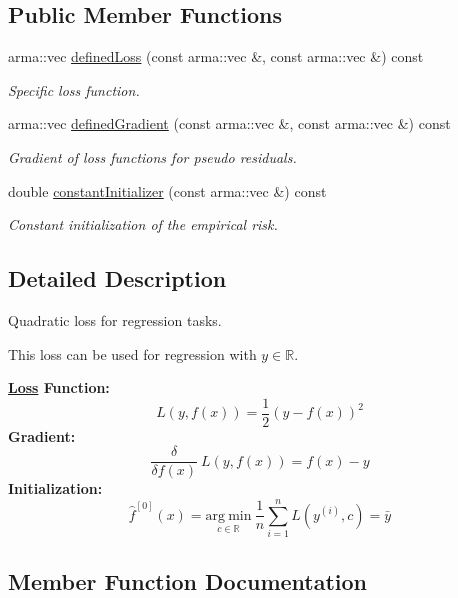 \subsection*{Public Member Functions}
\begin{DoxyCompactItemize}
\item 
arma\+::vec \mbox{\hyperlink{classloss_1_1_quadratic_loss_ae34f68243ffe021e309ed73a68796e1e}{defined\+Loss}} (const arma\+::vec \&, const arma\+::vec \&) const
\begin{DoxyCompactList}\small\item\em Specific loss function. \end{DoxyCompactList}\item 
arma\+::vec \mbox{\hyperlink{classloss_1_1_quadratic_loss_adb4da1acbad702b5ba8570abaa17d373}{defined\+Gradient}} (const arma\+::vec \&, const arma\+::vec \&) const
\begin{DoxyCompactList}\small\item\em Gradient of loss functions for pseudo residuals. \end{DoxyCompactList}\item 
double \mbox{\hyperlink{classloss_1_1_quadratic_loss_a43989f3fbecc27351513afe1136cdf38}{constant\+Initializer}} (const arma\+::vec \&) const
\begin{DoxyCompactList}\small\item\em Constant initialization of the empirical risk. \end{DoxyCompactList}\end{DoxyCompactItemize}


\subsection{Detailed Description}
Quadratic loss for regression tasks. 

This loss can be used for regression with $y \in \mathbb{R}$.

{\bfseries \mbox{\hyperlink{classloss_1_1_loss}{Loss}} Function\+:} \[ L(y, f(x)) = \frac{1}{2}\left( y - f(x) \right)^2 \] {\bfseries Gradient\+:} \[ \frac{\delta}{\delta f(x)}\ L(y, f(x)) = f(x) - y \] {\bfseries Initialization\+:} \[ \hat{f}^{[0]}(x) = \underset{c\in\mathbb{R}}{\mathrm{arg~min}}\ \frac{1}{n}\sum\limits_{i=1}^n L\left(y^{(i)}, c\right) = \bar{y} \] 

\subsection{Member Function Documentation}
\mbox{\label{classloss_1_1_quadratic_loss_a43989f3fbecc27351513afe1136cdf38}} 
